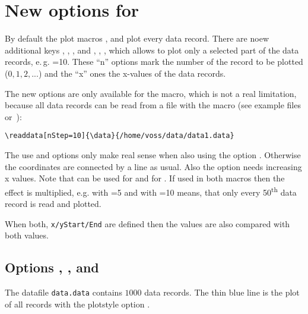 \documentclass[11pt,english,BCOR10mm,DIV12,bibliography=totoc,parskip=false,smallheadings
    headexclude,footexclude,oneside,dvipsnames,svgnames]{pst-doc}
\begin{document}
\section{New options for }
By default the plot macros ,  and  plot every
data record. There are noew additional keys 
, , , and , , 
, which allows
to plot only a selected part of the data records, e.\,g. =10. These "`n"'
options mark the number of the record to be plotted ($0,1,2,...$) and the "`x"' ones the x-values of the data records.

The new options are only available
for the  macro, which is not a real limitation, because all data records can be read
from a file with the  macro (see example files or~\cite{dtk02.2:jackson.voss:plot-funktionen}):

\begin{lstlisting}[style=syntax]
\readdata[nStep=10]{\data}{/home/voss/data/data1.data}
\end{lstlisting}

The use  and  options only make real sense
when also using the option . Otherwise the
coordinates are connected by a line as usual. Also the
 option needs increasing x values. Note that
 can be used for  and for
. If used in both macros then the effect is
multiplied, e.g.  with =5 and
 with =10 means, that only every
50\textsuperscript{th} data record is read and plotted.

When both, \verb|x/yStart/End| are defined then the values are also compared with
both values.

\subsection{Options , , and }\label{nxstep}

The datafile \verb|data.data| contains $1000$ data records. The thin blue line is the plot
of all records with the plotstyle option .
\end{document}
